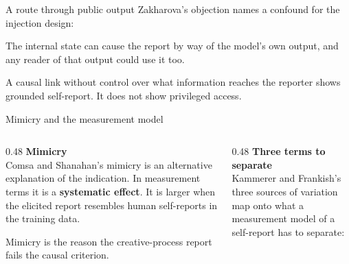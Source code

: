 \documentclass[aspectratio=169,11pt]{beamer}
\begin{document}
\begin{frame}[label=confound]{A route through public output}
Zakharova's objection names a confound for the injection design:

\vspace{0.5em}
\begin{center}
\end{center}

\vspace{0.5em}
The internal state can cause the report by way of the model's own output, and any reader of that output could use it too.

\vspace{0.3em}
{\small A causal link without control over what information reaches the reporter shows grounded self-report. It does not show privileged access.}
\end{frame}

\begin{frame}[label=measmodel]{Mimicry and the measurement model}
\begin{columns}[T]
\begin{column}{0.48\textwidth}
{\small\textbf{Mimicry}}\\[0.3em]
{\footnotesize Comsa and Shanahan's mimicry is an alternative explanation of the indication. In measurement terms it is a \textbf{systematic effect}. It is larger when the elicited report resembles human self-reports in the training data.}

\vspace{0.4em}
{\footnotesize Mimicry is the reason the creative-process report fails the causal criterion.}
\end{column}
\begin{column}{0.48\textwidth}
{\small\textbf{Three terms to separate}}\\[0.3em]
{\footnotesize Kammerer and Frankish's three sources of variation map onto what a measurement model of a self-report has to separate:}

\vspace{0.3em}
\end{column}
\end{columns}
\end{frame}
\end{document}
